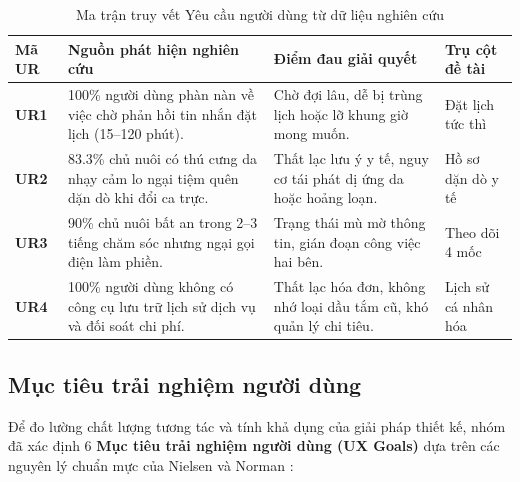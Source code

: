 \begin{table}[H]
\centering
\small
\begin{tabularx}{\textwidth}{|l|X|X|l|}
\hline
\textbf{Mã UR} & \textbf{Nguồn phát hiện nghiên cứu} & \textbf{Điểm đau giải quyết} & \textbf{Trụ cột đề tài} \\ \hline
\textbf{UR1} & 100\% người dùng phàn nàn về việc chờ phản hồi tin nhắn đặt lịch (15--120 phút). & Chờ đợi lâu, dễ bị trùng lịch hoặc lỡ khung giờ mong muốn. & Đặt lịch tức thì \\ \hline
\textbf{UR2} & 83.3\% chủ nuôi có thú cưng da nhạy cảm lo ngại tiệm quên dặn dò khi đổi ca trực. & Thất lạc lưu ý y tế, nguy cơ tái phát dị ứng da hoặc hoảng loạn. & Hồ sơ dặn dò y tế \\ \hline
\textbf{UR3} & 90\% chủ nuôi bất an trong 2--3 tiếng chăm sóc nhưng ngại gọi điện làm phiền. & Trạng thái mù mờ thông tin, gián đoạn công việc hai bên. & Theo dõi 4 mốc \\ \hline
\textbf{UR4} & 100\% người dùng không có công cụ lưu trữ lịch sử dịch vụ và đối soát chi phí. & Thất lạc hóa đơn, không nhớ loại dầu tắm cũ, khó quản lý chi tiêu. & Lịch sử cá nhân hóa \\ \hline
\end{tabularx}
\caption{Ma trận truy vết Yêu cầu người dùng từ dữ liệu nghiên cứu}
\label{tab:traceability_ur}
\end{table}

\subsection{Mục tiêu trải nghiệm người dùng}
Để đo lường chất lượng tương tác và tính khả dụng của giải pháp thiết kế, nhóm đã xác định 6 \textbf{Mục tiêu trải nghiệm người dùng (UX Goals)} dựa trên các nguyên lý chuẩn mực của Nielsen và Norman \cite{nielsen1994usability, norman2013design}:

